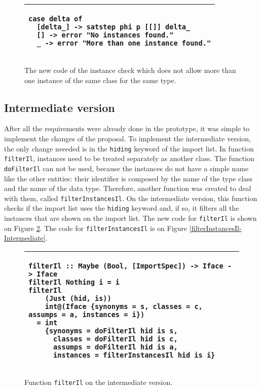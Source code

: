 \documentclass[msc]{ppgccufmg}
\begin{document}
\begin{figure}
\caption{The new code of the instance check which does not allow more than one instance of the same class for the same type.\label{il-orig}}
\begin{tabular}{|p{\textwidth}|}
\hline
\begin{verbatim}
case delta of
  [delta_] -> satstep phi p [[]] delta_
  [] -> error "No instances found."
  _ -> error "More than one instance found."
\end{verbatim}
\\
\hline
\end{tabular}
\end{figure}

\subsection{Intermediate version}
After all the requirements were already done in the prototype, it was simple to implement the changes of the proposal.
To implement the intermediate version, the only change neeeded is in the \texttt{hiding} keyword of the import list.
In function \texttt{filterIl}, instances need to be treated separately as another class.
The function \texttt{doFilterIl} can not be used, because the instances do not have a simple name like the other entities: their identifier is composed by the name of the type class and the name of the data type.
Therefore, another function was created to deal with them, called \texttt{filterInstancesIl}.
On the intermediate version, this function checks if the import list uses the \texttt{hiding} keyword and, if so, it filters all the instances that are shown on the import list.
The new code for \texttt{filterIl} is shown on Figure \ref{filterIl-Intermediate}.
The code for \texttt{filterInstancesIl} is on Figure \ref{filterInstancesIl-Intermediate}.

\begin{figure}
\caption{Function \texttt{filterIl} on the intermediate version.\label{filterIl-Intermediate}}
\begin{tabular}{|p{\textwidth}|}
\hline
\begin{verbatim}
filterIl :: Maybe (Bool, [ImportSpec]) -> Iface -> Iface
filterIl Nothing i = i
filterIl
    (Just (hid, is))
    int@(Iface {synonyms = s, classes = c, assumps = a, instances = i})
  = int
    {synonyms = doFilterIl hid is s,
      classes = doFilterIl hid is c,
      assumps = doFilterIl hid is a,
      instances = filterInstancesIl hid is i}
\end{verbatim}
\\
\hline
\end{tabular}
\end{figure}
\end{document}
